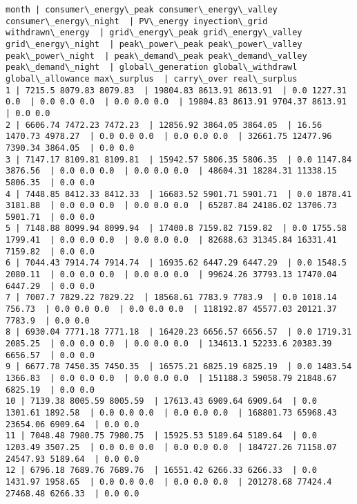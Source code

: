\documentclass[11pt]{article}
\begin{document}
    \begin{Verbatim}[commandchars=\\\{\}]
month | consumer\_energy\_peak consumer\_energy\_valley consumer\_energy\_night  | PV\_energy inyection\_grid withdrawn\_energy  | grid\_energy\_peak grid\_energy\_valley grid\_energy\_night  | peak\_power\_peak peak\_power\_valley peak\_power\_night  | peak\_demand\_peak peak\_demand\_valley peak\_demand\_night  | global\_generation global\_withdrawl global\_allowance max\_surplus  | carry\_over real\_surplus
1 | 7215.5 8079.83 8079.83  | 19804.83 8613.91 8613.91  | 0.0 1227.31 0.0  | 0.0 0.0 0.0  | 0.0 0.0 0.0  | 19804.83 8613.91 9704.37 8613.91  | 0.0 0.0
2 | 6606.74 7472.23 7472.23  | 12856.92 3864.05 3864.05  | 16.56 1470.73 4978.27  | 0.0 0.0 0.0  | 0.0 0.0 0.0  | 32661.75 12477.96 7390.34 3864.05  | 0.0 0.0
3 | 7147.17 8109.81 8109.81  | 15942.57 5806.35 5806.35  | 0.0 1147.84 3876.56  | 0.0 0.0 0.0  | 0.0 0.0 0.0  | 48604.31 18284.31 11338.15 5806.35  | 0.0 0.0
4 | 7448.85 8412.33 8412.33  | 16683.52 5901.71 5901.71  | 0.0 1878.41 3181.88  | 0.0 0.0 0.0  | 0.0 0.0 0.0  | 65287.84 24186.02 13706.73 5901.71  | 0.0 0.0
5 | 7148.88 8099.94 8099.94  | 17400.8 7159.82 7159.82  | 0.0 1755.58 1799.41  | 0.0 0.0 0.0  | 0.0 0.0 0.0  | 82688.63 31345.84 16331.41 7159.82  | 0.0 0.0
6 | 7044.43 7914.74 7914.74  | 16935.62 6447.29 6447.29  | 0.0 1548.5 2080.11  | 0.0 0.0 0.0  | 0.0 0.0 0.0  | 99624.26 37793.13 17470.04 6447.29  | 0.0 0.0
7 | 7007.7 7829.22 7829.22  | 18568.61 7783.9 7783.9  | 0.0 1018.14 756.73  | 0.0 0.0 0.0  | 0.0 0.0 0.0  | 118192.87 45577.03 20121.37 7783.9  | 0.0 0.0
8 | 6930.04 7771.18 7771.18  | 16420.23 6656.57 6656.57  | 0.0 1719.31 2085.25  | 0.0 0.0 0.0  | 0.0 0.0 0.0  | 134613.1 52233.6 20383.39 6656.57  | 0.0 0.0
9 | 6677.78 7450.35 7450.35  | 16575.21 6825.19 6825.19  | 0.0 1483.54 1366.83  | 0.0 0.0 0.0  | 0.0 0.0 0.0  | 151188.3 59058.79 21848.67 6825.19  | 0.0 0.0
10 | 7139.38 8005.59 8005.59  | 17613.43 6909.64 6909.64  | 0.0 1301.61 1892.58  | 0.0 0.0 0.0  | 0.0 0.0 0.0  | 168801.73 65968.43 23654.06 6909.64  | 0.0 0.0
11 | 7048.48 7980.75 7980.75  | 15925.53 5189.64 5189.64  | 0.0 1203.49 3507.25  | 0.0 0.0 0.0  | 0.0 0.0 0.0  | 184727.26 71158.07 24547.93 5189.64  | 0.0 0.0
12 | 6796.18 7689.76 7689.76  | 16551.42 6266.33 6266.33  | 0.0 1431.97 1958.65  | 0.0 0.0 0.0  | 0.0 0.0 0.0  | 201278.68 77424.4 27468.48 6266.33  | 0.0 0.0

    \end{Verbatim}
\end{document}

